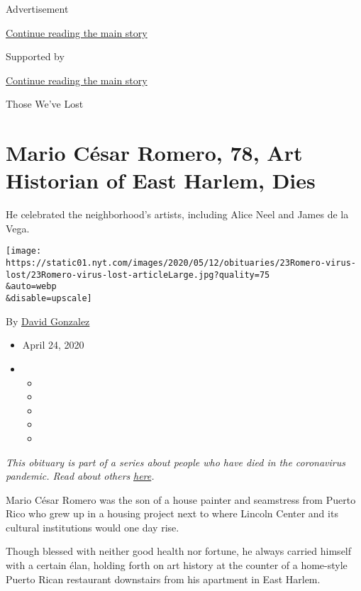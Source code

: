 Advertisement

\protect\hyperlink{after-top}{Continue reading the main story}

Supported by

\protect\hyperlink{after-sponsor}{Continue reading the main story}

Those We've Lost

\hypertarget{mario-cuxe9sar-romero-78-art-historian-of-east-harlem-dies}{%
\section{Mario César Romero, 78, Art Historian of East Harlem,
Dies}\label{mario-cuxe9sar-romero-78-art-historian-of-east-harlem-dies}}

He celebrated the neighborhood's artists, including Alice Neel and James
de la Vega.

\texttt{[image: https://static01.nyt.com/images/2020/05/12/obituaries/23Romero-virus-lost/23Romero-virus-lost-articleLarge.jpg?quality=75\\\&auto=webp\\\&disable=upscale]}

By \href{https://www.nytimes.com/by/david-gonzalez}{David Gonzalez}

\begin{itemize}
\item
  April 24, 2020
\item
  \begin{itemize}
  \item
  \item
  \item
  \item
  \item
  \end{itemize}
\end{itemize}

\emph{This obituary is part of a series about people who have died in
the coronavirus pandemic. Read about others}
\href{https://www.nytimes.com/series/people-who-have-died-of-the-coronavirus}{\emph{here}}\emph{.}

Mario César Romero was the son of a house painter and seamstress from
Puerto Rico who grew up in a housing project next to where Lincoln
Center and its cultural institutions would one day rise.

Though blessed with neither good health nor fortune, he always carried
himself with a certain élan, holding forth on art history at the counter
of a home-style Puerto Rican restaurant downstairs from his apartment in
East Harlem.

